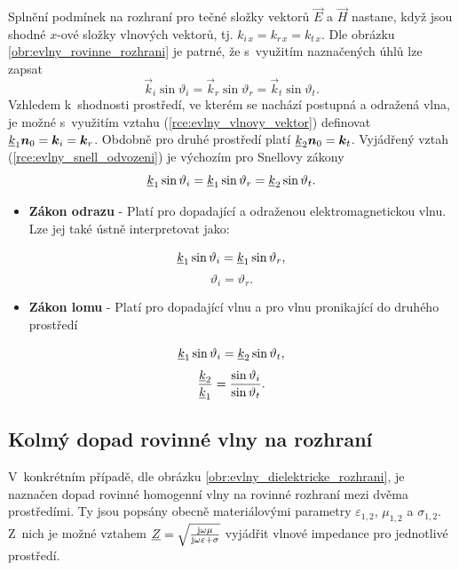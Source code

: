 Splnění podmínek na rozhraní pro tečné složky vektorů $\vec E$ a $\vec H$ nastane, když jsou shodné $x$-ové složky vlnových vektorů, tj. $k_{i\,x} = k_{r\,x} = k_{t\,x}$. Dle obrázku \ref{obr:evlny_rovinne_rozhrani} je patrné, že s~využitím naznačených úhlů lze zapsat
\begin{displaymath}
	\vec k_{i}\sin\vartheta_{i} = \vec k_{r}\sin\vartheta_{r} = \vec k_{t}\sin\vartheta_{t}.
\end{displaymath}
Vzhledem k~shodnosti prostředí, ve kterém se nachází postupná a odražená vlna, je možné s~využitím vztahu (\ref{rce:evlny_vlnovy_vektor}) definovat ${\underline{k}}_{1}\mbox{\boldmath$n$}_0 = \mbox{\boldmath$k$}_{i} = \mbox{\boldmath$k$}_{r}$. Obdobně pro druhé prostředí platí ${\underline{k}}_{2}\mbox{\boldmath$n$}_0 = \mbox{\boldmath$k$}_{t}$. Vyjádřený vztah (\ref{rce:evlny_snell_odvozeni}) je výchozím pro Snellovy zákony
\begin{equation}
	{\underline{k}}_{1}\sin\vartheta_{i} = {\underline{k}}_{1}\sin\vartheta_{r} = {\underline{k}}_{2}\sin\vartheta_{t}.
	\label{rce:evlny_snell_odvozeni}
\end{equation}
\begin{itemize}
\item {\bf Zákon odrazu} - Platí pro dopadající a odraženou elektromagnetickou vlnu. Lze jej také ústně interpretovat jako: 
\end{itemize}
\begin{displaymath}
	{\underline{k}}_{1}\sin\vartheta_{i} = {\underline{k}}_{1}\sin\vartheta_{r},
\end{displaymath}
\begin{equation}
	\vartheta_{i} = \vartheta_{r}.
	\label{rce:evlny_zakon_odrazu}
\end{equation}
\begin{itemize}
\item {\bf Zákon lomu} - Platí pro dopadající vlnu a pro vlnu pronikající do druhého prostředí
\end{itemize}
\begin{displaymath}
	{\underline{k}}_{1}\sin\vartheta_{i} = {\underline{k}}_{2}\sin\vartheta_{t},
\end{displaymath}
\begin{equation}
	\frac{{\underline{k}}_{2}}{{\underline{k}}_{1}} = \frac{\sin\vartheta_{i}}{\sin\vartheta_{t}}.
	\label{rce:evlny_zakon_lomu}
\end{equation}

\subsection{Kolmý dopad rovinné vlny na rozhraní} \label{subsec:kolmy_dopad}
V~konkrétním případě, dle obrázku \ref{obr:evlny_dielektricke_rozhrani}, je naznačen dopad rovinné homogenní vlny na rovinné rozhraní mezi dvěma prostředími. Ty jsou popsány obecně materiálovými parametry $\varepsilon_{1,2}$, $\mu_{1,2}$ a $\sigma_{1,2}$. Z~nich je možné vztahem ${\underline{Z}}=\sqrt{\frac{\mathrm{j}\omega\mu}{\mathrm{j}\omega\varepsilon + \sigma}}$ vyjádřit vlnové impedance pro jednotlivé prostředí.

